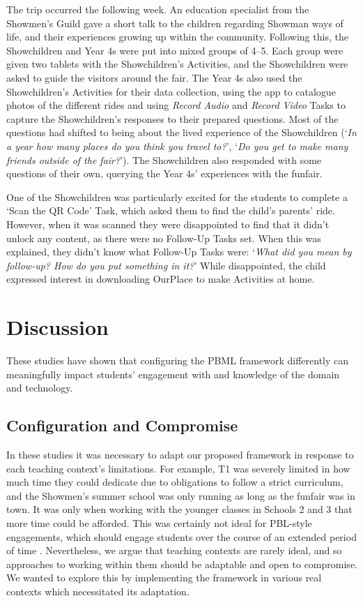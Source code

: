 The trip occurred the following week. An education specialist from the Showmen's Guild gave a short talk to the children regarding Showman ways of life, and their experiences growing up within the community. Following this, the Showchildren and Year 4s were put into mixed groups of 4--5. Each group were given two tablets with the Showchildren's Activities, and the Showchildren were asked to guide the visitors around the fair. The Year 4s also used the Showchildren's Activities for their data collection, using the app to catalogue photos of the different rides and using \textit{Record Audio} and \textit{Record Video} Tasks to capture the Showchildren's responses to their prepared questions. Most of the questions had shifted to being about the lived experience of the Showchildren (`\textit{In a year how many places do you think you travel to?}', `\textit{Do you get to make many friends outside of the fair?}'). The Showchildren also responded with some questions of their own, querying the Year 4s' experiences with the funfair.

One of the Showchildren was particularly excited for the students to complete a `Scan the QR Code' Task, which asked them to find the child's parents' ride. However, when it was scanned they were disappointed to find that it didn't unlock any content, as there were no Follow-Up Tasks set. When this was explained, they didn't know what Follow-Up Tasks were: `\textit{What did you mean by follow-up? How do you put something in it?}' While disappointed, the child expressed interest in downloading OurPlace to make Activities at home.

\section{Discussion}
These studies have shown that configuring the PBML framework differently can meaningfully impact students' engagement with and knowledge of the domain and technology.

\subsection{Configuration and Compromise}
In these studies it was necessary to adapt our proposed framework in response to each teaching context's limitations. For example, T1 was severely limited in how much time they could dedicate due to obligations to follow a strict curriculum, and the Showmen's summer school was only running as long as the funfair was in town. It was only when working with the younger classes in Schools 2 and 3 that more time could be afforded. This was certainly not ideal for PBL-style engagements, which should engage students over the course of an extended period of time \cite{Blumenfeld1991}. Nevertheless, we argue that teaching contexts are rarely ideal, and so approaches to working within them should be adaptable and open to compromise. We wanted to explore this by implementing the framework in various real contexts which necessitated its adaptation.

